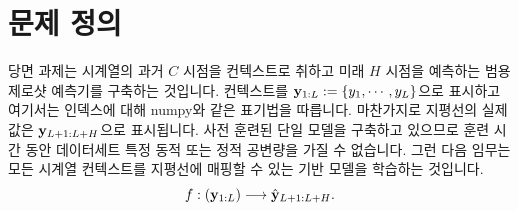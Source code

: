 \documentclass{article}
\begin{document}



\section{문제 정의}
\label{sec:pdef}
당면 과제는 시계열의 과거 $C$ 시점을 컨텍스트로 취하고 미래 $H$ 시점을 예측하는 범용 제로샷 예측기를 구축하는 것입니다. 컨텍스트를 $\mathbf{y}_{1:L} := \{y_1, \cdots, y_L\}$으로 표시하고 여기서는 인덱스에 대해 numpy와 같은 표기법을 따릅니다. 마찬가지로 지평선의 실제 값은 $\mathbf{y}_{L+1:L+H}$으로 표시됩니다. 사전 훈련된 단일 모델을 구축하고 있으므로 훈련 시간 동안 데이터세트 특정 동적 또는 정적 공변량을 가질 수 없습니다.
그런 다음 임무는 모든 시계열 컨텍스트를 지평선에 매핑할 수 있는 기반 모델을 학습하는 것입니다.
\begin{equation}
     f: \left( \*y_{1:L} \right) \longrightarrow \hat{\*y}_{L+1:L+H}.
\end{equation}
\end{document}
